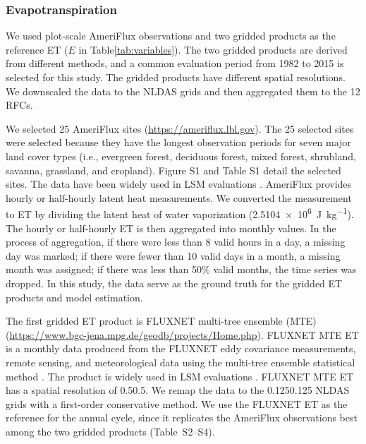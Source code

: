 \documentclass[essd, manuscript]{copernicus}
\begin{document}
\subsubsection{Evapotranspiration}\label{sec:methods:ref:et}

We used plot-scale AmeriFlux observations and two gridded products as the reference ET (\(E\) in Table\ref{tab:variables}). The two gridded products are derived from different methods, and a common evaluation period from 1982 to 2015 is selected for this study. The gridded products have different spatial resolutions. We downscaled the data to the NLDAS grids and then aggregated them to the 12 RFCs.

We selected 25 AmeriFlux sites (\url{https://ameriflux.lbl.gov}). The 25 selected sites were selected because they have the longest observation periods for seven major land cover types (i.e., evergreen forest, deciduous forest, mixed forest, shrubland, savanna, grassland, and cropland). Figure S1 and Table S1 detail the selected sites. The data have been widely used in LSM evaluations \citep{cai2014JGRA, zhang2020AFM}. AmeriFlux provides hourly or half-hourly latent heat measurements. We converted the measurement to ET by dividing the latent heat of water vaporization (\qty{2.5104e6}{J.kg^{-1}}). The hourly or half-hourly ET is then aggregated into monthly values. In the process of aggregation, if there were less than 8 valid hours in a day, a missing day was marked; if there were fewer than 10 valid days in a month, a missing month was assigned; if there was less than 50\% valid months, the time series was dropped. In this study, the data serve as the ground truth for the gridded ET products and model estimation.

The first gridded ET product is FLUXNET multi-tree ensemble (MTE) \citep{jung2009B} (\url{https://www.bgc-jena.mpg.de/geodb/projects/Home.php}). FLUXNET MTE ET is a monthly data produced from the FLUXNET eddy covariance measurements, remote sensing, and meteorological data using the multi-tree ensemble statistical method \citep{jung2009B}. The product is widely used in LSM evaluations \citep{cai2014JGRA, ma2017JGRA, xia2016JGRA, jung2019SD, fang2020AFM, zhang2020AFM, pan2020HESS}. FLUXNET MTE ET has a spatial resolution of 0.5\degree{}\times{}0.5\degree{}. We remap the data to the 0.125\degree{}\times{}0.125\degree{} NLDAS grids with a first-order conservative method. We use the FLUXNET ET as the reference for the annual cycle, since it replicates the AmeriFlux observations best among the two gridded products (Table~S2--S4).
\end{document}
